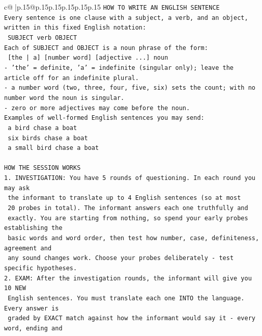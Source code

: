 \documentclass{article}
\begin{document}
{\begin{supertabular}{c@{$\;$}|p{.15\linewidth}@{}p{.15\linewidth}p{.15\linewidth}p{.15\linewidth}p{.15\linewidth}p{.15\linewidth}}
{{{\texttt{HOW TO WRITE AN ENGLISH SENTENCE} \\
\texttt{Every sentence is one clause with a subject, a verb, and an object, written in this fixed English notation:} \\
\texttt{    SUBJECT  verb  OBJECT} \\
\texttt{Each of SUBJECT and OBJECT is a noun phrase of the form:} \\
\texttt{    {[}the | a{]}  {[}number word{]}  {[}adjective ...{]}  noun} \\
\texttt{{-} 'the' = definite, 'a' = indefinite (singular only); leave the article off for an indefinite plural.} \\
\texttt{{-} a number word (two, three, four, five, six) sets the count; with no number word the noun is singular.} \\
\texttt{{-} zero or more adjectives may come before the noun.} \\
\texttt{Examples of well{-}formed English sentences you may send:} \\
\texttt{    a bird chase a boat} \\
\texttt{    six birds chase a boat} \\
\texttt{    a small bird chase a boat} \\
\\ 
\texttt{HOW THE SESSION WORKS} \\
\texttt{1. INVESTIGATION: You have 5 rounds of questioning. In each round you may ask} \\
\texttt{   the informant to translate up to 4 English sentences (so at most} \\
\texttt{   20 probes in total). The informant answers each one truthfully and} \\
\texttt{   exactly. You are starting from nothing, so spend your early probes establishing the} \\
\texttt{   basic words and word order, then test how number, case, definiteness, agreement and} \\
\texttt{   any sound changes work. Choose your probes deliberately {-} test specific hypotheses.} \\
\texttt{2. EXAM: After the investigation rounds, the informant will give you 10 NEW} \\
\texttt{   English sentences. You must translate each one INTO the language. Every answer is} \\
\texttt{   graded by EXACT match against how the informant would say it {-} every word, ending and} \\
}}}
\end{supertabular}}
\end{document}
